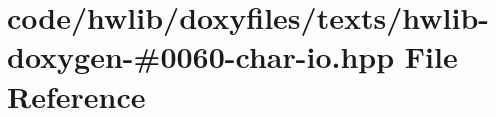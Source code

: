 \hypertarget{hwlib-doxygen-#0060-char-io_8hpp}{}\section{code/hwlib/doxyfiles/texts/hwlib-\/doxygen-\/\#0060-\/char-\/io.hpp File Reference}
\label{hwlib-doxygen-#0060-char-io_8hpp}
